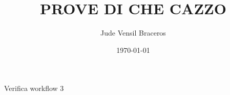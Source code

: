 \documentclass{article}
\title{PROVE DI CHE CAZZO}
\author{Jude Vensil Braceros}
\date{\today}
\begin{document}
\maketitle

Verifica workflow 3
\end{document}
